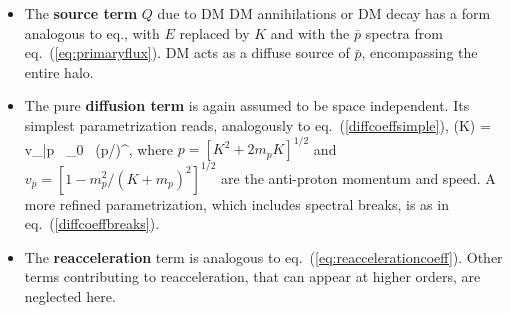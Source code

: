 \begin{itemize}
\item[$\triangleright$] The {\bf source term} $Q$ due to DM DM annihilations or DM decay has a form analogous to eq., 
with $E$ replaced by $K$ and with the $\bar p$ spectra from eq.~(\ref{eq:primaryflux}). 
DM acts as a diffuse source of $\bar p$, encompassing the entire halo.


\item[$\triangleright$] The pure {\bf diffusion term} is again assumed to be space independent. Its simplest parametrization reads, analogously to eq.~(\ref{diffcoeffsimple}),
\beq
{}(K) = v_{\bar p} \, _0 \, (p/\GeV)^\delta,
\label{eq:diffcoeffsimplePbar}
\eeq
where $p = [K^2 +2 m_p K]^{1/2}$ and $v_{\bar p} = [1-m_p^2/(K+m_p)^2]^{1/2}$ are the anti-proton momentum and speed. 
A more refined parametrization, which includes spectral breaks, is as in eq.~(\ref{diffcoeffbreaks}).

\item[$\triangleright$] The {\bf reacceleration} term is analogous to eq.~(\ref{eq:reaccelerationcoeff}). Other terms contributing to reacceleration, that can appear at higher orders, are neglected here.


\end{itemize}
